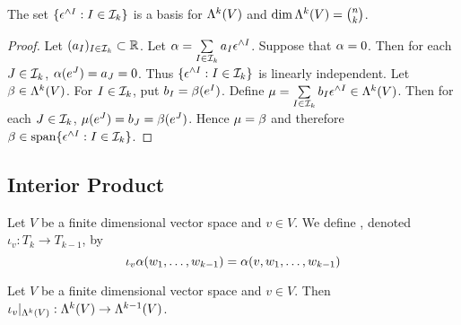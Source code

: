 \documentclass{book}
\begin{document}
	\begin{ex}
		The set $\{\epsilon^{\wedge I} : I \in \mathcal{I}_k\}$ is a basis for $\Lambda^k(V)$ and $\dim \Lambda^k(V) = {n \choose k}$.
	\end{ex}

	\begin{proof}
		Let $(a_I)_{I \in \mathcal{I}_k} \subset \mathbb{R}$. Let $\alpha = \sum\limits_{I \in \mathcal{I}_k}a_I \epsilon^{\wedge I} $. Suppose that $\alpha = 0$. Then for each $J \in \mathcal{I}_k$, $\alpha(e^J) = a_J = 0$. Thus $\{\epsilon^{\wedge I} : I \in \mathcal{I}_k\}$ is linearly independent. Let $\beta \in \Lambda^k(V)$. For $I \in \mathcal{I}_k$, put $b_I = \beta(e^I)$. Define $\mu = \sum\limits_{I \in \mathcal{I}_k} b_I\epsilon^{\wedge I} \in \Lambda^k(V)$. Then for each $J \in \mathcal{I}_k$, $\mu(e^J) = b_J = \beta(e^J)$. Hence $\mu = \beta$ and therefore $\beta \in \operatorname{span} \{\epsilon^{\wedge I} :I \in \mathcal{I}_k\}$.
	\end{proof}














	
	\subsection{Interior Product}
	\begin{defn}
		Let $V$ be a finite dimensional vector space and $v \in V$. We define , denoted $\iota_v: T_k \rightarrow T_{k-1}$, by 
		$$\iota_v \alpha (w_1, \ldots, w_{k-1}) = \alpha(v, w_1, \ldots, w_{k-1})$$
	\end{defn}

	\begin{ex}
		Let $V$ be a finite dimensional vector space and $v \in V$. Then $\iota_v|_{\Lambda^k(V)} : \Lambda^k(V) \rightarrow \Lambda^{k-1}(V)$.
	\end{ex}
	
\end{document}
